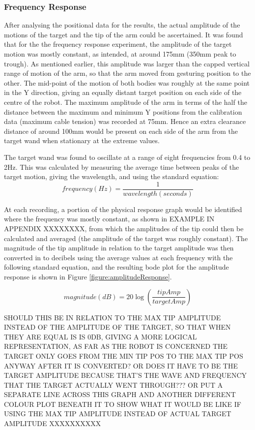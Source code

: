 \documentclass[11pt]{article}
\begin{document}
\subsubsection{Frequency Response}

After analysing the positional data for the results, the actual amplitude of the motions of the target and the tip of the arm could be ascertained. It was found that for the the frequency response experiment, the amplitude of the target motion was mostly constant, as intended, at around 175mm (350mm peak to trough). As mentioned earlier, this amplitude was larger than the capped vertical range of motion of the arm, so that the arm moved from gesturing position to the other. The mid-point of the motion of both bodies was roughly at the same point in the Y direction, giving an equally distant target position on each side of the centre of the robot. The maximum amplitude of the arm in terms of the half the distance between the maximum and minimum Y positions from the calibration data (maximum cable tension) was recorded at 75mm. Hence an extra clearance distance of around 100mm would be present on each side of the arm from the target wand when stationary at the extreme values. 

The target wand was found to oscillate at a range of eight frequencies from 0.4 to 2Hz. This was calculated by measuring the average time between peaks of the target motion, giving the wavelength, and using the standard equation:
\begin{equation}
frequency(Hz) = \frac{1}{wavelength(seconds)}
\end{equation}

At each recording, a portion of the physical response graph would be identified where the frequency was mostly constant, as shown in EXAMPLE IN APPENDIX XXXXXXXX, from which the amplitudes of the tip could then be calculated and averaged (the amplitude of the target was roughly constant). The magnitude of the tip amplitude in relation to the target amplitude was then converted in to decibels using the average values at each frequency with the following standard equation, and the resulting bode plot for the amplitude response is shown in Figure \ref{figure:amplitudeResponse}.

\begin{equation}
magnitude(dB) = 20\log \left(\frac{tipAmp}{targetAmp}\right)
\end{equation}

SHOULD THIS BE IN RELATION TO THE MAX TIP AMPLITUDE INSTEAD OF THE AMPLITUDE OF THE TARGET, SO THAT WHEN THEY ARE EQUAL IS IS 0DB, GIVING A MORE LOGICAL REPRESENTATION, AS FAR AS THE ROBOT IS CONCERNED THE TARGET ONLY GOES FROM THE MIN TIP POS TO THE MAX TIP POS ANYWAY AFTER IT IS CONVERTED? OR DOES IT HAVE TO BE THE TARGET AMPLITUDE BECAUSE THAT'S THE WAVE AND FREQUENCY THAT THE TARGET ACTUALLY WENT THROUGH??? OR PUT A SEPARATE LINE ACROSS THIS GRAPH AND ANOTHER DIFFERENT COLOUR PLOT BENEATH IT TO SHOW WHAT IT WOULD BE LIKE IF USING THE MAX TIP AMPLITUDE INSTEAD OF ACTUAL TARGET AMPLITUDE XXXXXXXXXX
\end{document}
